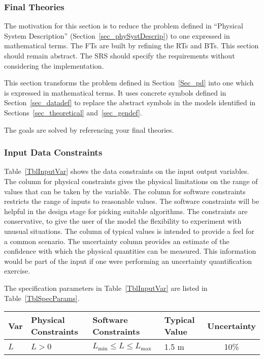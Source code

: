\documentclass[12pt]{article}
\begin{document}
\subsubsection{Final Theories} \label{sec_instance}    

The motivation for this section is to reduce the problem defined in ``Physical
System Description'' (Section~\ref{sec_phySystDescrip}) to one expressed in
mathematical terms. The FTs are built by refining the RTs and BTs.  This
section should remain abstract.  The SRS should specify the requirements without
considering the implementation.

This section transforms the problem defined in Section~\ref{Sec_pd} into 
one which is expressed in mathematical terms. It uses concrete symbols defined 
in Section~\ref{sec_datadef} to replace the abstract symbols in the models 
identified in Sections~\ref{sec_theoretical} and~\ref{sec_gendef}.

The goals are solved by referencing your final theories.

\subsubsection{Input Data Constraints} \label{sec_DataConstraints}    

Table~\ref{TblInputVar} shows the data constraints on the input output
variables.  The column for physical constraints gives the physical limitations
on the range of values that can be taken by the variable.  The column for
software constraints restricts the range of inputs to reasonable values.  The
software constraints will be helpful in the design stage for picking suitable
algorithms.  The constraints are conservative, to give the user of the model the
flexibility to experiment with unusual situations.  The column of typical values
is intended to provide a feel for a common scenario.  The uncertainty column
provides an estimate of the confidence with which the physical quantities can be
measured.  This information would be part of the input if one were performing an
uncertainty quantification exercise.

The specification parameters in Table~\ref{TblInputVar} are listed in
Table~\ref{TblSpecParams}.

\begin{table}[!h]
  \caption{Input Variables} \label{TblInputVar}
  \renewcommand{\arraystretch}{1.2}
\noindent \begin{longtable*}{l l l l c} 
  \toprule
  \textbf{Var} & \textbf{Physical Constraints} & \textbf{Software Constraints} &
                             \textbf{Typical Value} & \textbf{Uncertainty}\\
  \midrule 
  $L$ & $L > 0$ & $L_{\text{min}} \leq L \leq L_{\text{max}}$ & 1.5 \si[per-mode=symbol] {\metre} & 10\%
  \\
  \bottomrule
\end{longtable*}
\end{table}
\end{document}

